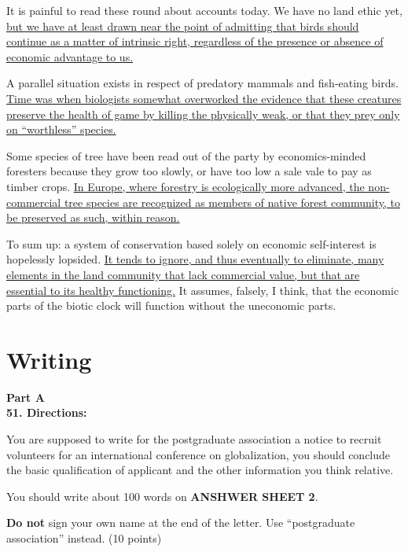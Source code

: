 It is painful to read these round about accounts today. We have no land
ethic yet, \transnum \uline{but we have at least drawn near the point of
	admitting that birds should continue as a matter of intrinsic right,
	regardless of the presence or absence of economic advantage to us.}

A parallel situation exists in respect of predatory mammals and
fish-eating birds. \transnum \uline{Time was when biologists somewhat
	overworked the evidence that these creatures preserve the health of
	game by killing the physically weak, or that they prey only on
	``worthless'' species.}

Some species of tree have been read out of the party by economics-minded
foresters because they grow too slowly, or have too low a sale vale to
pay as timber crops. \transnum \uline{In Europe, where forestry is
	ecologically more advanced, the non-commercial tree species are
	recognized as members of native forest community, to be preserved as
	such, within reason.}

To sum up: a system of conservation based solely on economic
self-interest is hopelessly lopsided. \transnum \uline{It tends to
	ignore, and thus eventually to eliminate, many elements in the land
	community that lack commercial value, but that are essential to its
	healthy functioning.} It assumes, falsely, I think, that the economic
parts of the biotic clock will function without the uneconomic parts.



\section{Writing}


\noindent
\textbf{Part A}\\
\textbf{51. Directions:}




You are supposed to write for the postgraduate association a notice to
recruit volunteers for an international conference on globalization, you
should conclude the basic qualification of applicant and the other
information you think relative.

You should write about 100 words on \textbf{ANSHWER SHEET 2}.

 \textbf{Do not} sign your own name at
the end of the letter. Use ``postgraduate association'' instead. (10 points)



\vspace{2em}

